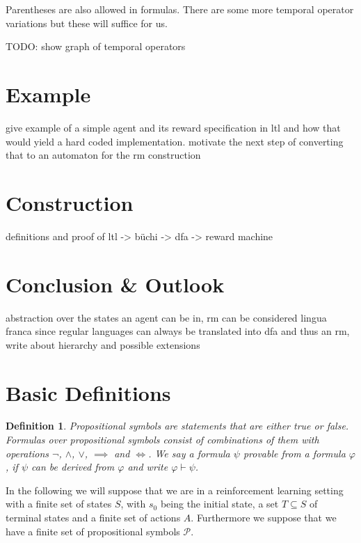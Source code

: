 \documentclass[12pt, a4paper]{article}
\theoremstyle{plain}
\newtheorem*{definition}{Definition}
\renewcommand{\phi}{\varphi}
\begin{document}
Parentheses are also allowed in formulas. There are some more temporal operator variations but these will suffice for us.

TODO: show graph of temporal operators

\section*{Example}

give example of a simple agent and its reward specification in ltl and how that would yield a hard coded implementation. motivate the next step of converting that to an automaton for the rm construction

\section*{Construction}

definitions and proof of ltl -> büchi -> dfa -> reward machine

\section*{Conclusion \& Outlook}

abstraction over the states an agent can be in, rm can be considered lingua franca since regular languages can always be translated into dfa and thus an rm, write about hierarchy and possible extensions

\section*{Basic Definitions}

\begin{definition}
	\emph{Propositional symbols} are statements that are either true or false. \emph{Formulas} over propositional symbols consist of combinations of them with operations $\neg$, $\wedge$, $\vee$, $\implies$ and $\iff$. We say a formula $\psi$ \emph{provable} from a formula $\phi$, if $\psi$ can be derived from $\phi$ and write $\phi \vdash \psi$.
\end{definition}

In the following we will suppose that we are in a reinforcement learning setting with a finite set of states $S$, with $s_0$ being the initial state, a set $T \subseteq S$ of terminal states and a finite set of actions $A$. Furthermore we suppose that we have a finite set of propositional symbols $\mathcal{P}$.
\end{document}
